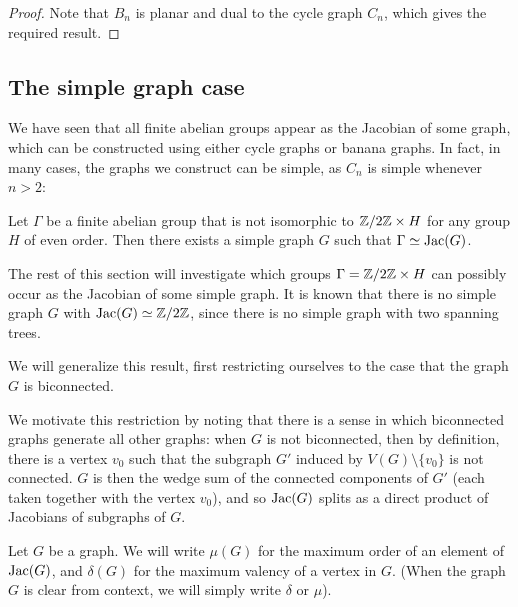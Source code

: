 \documentclass{amsart}
\begin{document}
\begin{proof}
  Note that $B_n$ is planar and dual to the cycle graph $C_n$, which
  gives the required result.
\end{proof}

\subsection{The simple graph case}
We have seen that all finite abelian groups appear as the Jacobian of
some graph, which can be constructed using either cycle graphs or
banana graphs. In fact, in many cases, the graphs we construct can be
simple, as $C_n$ is simple whenever $n > 2$:

\begin{prop}
  Let $\Gamma$ be a finite abelian group that is not isomorphic to
  $\mathbb{Z}/2\mathbb{Z} \times H$ for any group $H$ of even order. Then there exists
  a simple graph $G$ such that $\Gamma \simeq \operatorname{Jac}(G)$.
\end{prop}

The rest of this section will investigate which groups $\Gamma =
\mathbb{Z}/2\mathbb{Z} \times H$ can possibly occur as the Jacobian of some simple
graph. It is known that there is no simple graph $G$ with $\operatorname{Jac}(G)
\simeq \mathbb{Z}/2\mathbb{Z}$, since there is no simple graph with two spanning
trees. 

We will generalize this result, first restricting ourselves to the
case that the graph $G$ is biconnected.

\begin{remark}
  \label{remark:biconnected_wedge}
  We motivate this restriction by noting that there is a sense in
  which biconnected graphs generate all other graphs: when $G$ is not
  biconnected, then by definition, there is a vertex $v_0$ such that
  the subgraph $G'$ induced by $V(G) \setminus \{v_0\}$ is not
  connected. $G$ is then the wedge sum of the connected components of
  $G'$ (each taken together with the vertex $v_0$), and so $\operatorname{Jac}(G)$
  splits as a direct product of Jacobians of subgraphs of $G$.
\end{remark}

\begin{defn}
  Let $G$ be a graph. We will write $\mu(G)$ for the maximum order of
  an element of $\operatorname{Jac}(G)$, and $\delta(G)$ for the maximum valency of
  a vertex in $G$. (When the graph $G$ is clear from context, we will
  simply write $\delta$ or $\mu$).
\end{defn}
\end{document}
